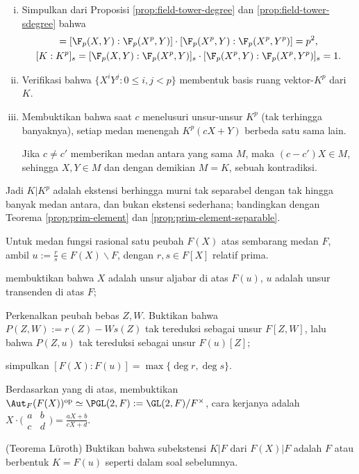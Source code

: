 \begin{Exercises}
\begin{enumerate}[(i)]
			\item Simpulkan dari Proposisi \ref{prop:field-tower-degree} dan \ref{prop:field-tower-sdegree} bahwa
				\begin{gather*}
					[K:K^p] = [\F_p(X,Y):\F_p(X^p,Y)] \cdot [\F_p(X^p,Y):\F_p(X^p,Y^p)] = p^2, \\
					[K:K^p]_s = [\F_p(X,Y):\F_p(X^p,Y)]_s \cdot [\F_p(X^p,Y):\F_p(X^p,Y^p)]_s = 1.
				\end{gather*}
			\item Verifikasi bahwa $\{ X^i Y^j: 0 \leq i,j < p \}$ membentuk basis ruang vektor-$K^p$ dari $K$.
			\item Membuktikan bahwa saat $c$ menelusuri unsur-unsur $K^p$ (tak terhingga banyaknya), setiap medan menengah $K^p(cX + Y)$ berbeda satu sama lain.
			\begin{hint} Jika $c \neq c'$ memberikan medan antara yang sama $M$, maka $(c-c')X \in M$, sehingga $X,Y \in M$ dan dengan demikian $M = K$, sebuah kontradiksi. \end{hint}
		\end{enumerate}
		Jadi $K|K^p$ adalah ekstensi berhingga murni tak separabel dengan tak hingga banyak medan antara, dan bukan ekstensi sederhana; bandingkan dengan Teorema \ref{prop:prim-element} dan \ref{prop:prim-element-separable}.
	\item Untuk medan fungsi rasional satu peubah $F(X)$ atas sembarang medan $F$, ambil $u := \frac{r}{s} \in F(X) \smallsetminus F$, dengan $r,s \in F[X]$ relatif prima.
		\begin{compactenum}[(i)]
			\item membuktikan bahwa $X$ adalah unsur aljabar di atas $F(u)$, $u$ adalah unsur transenden di atas $F$;
			\item Perkenalkan peubah bebas $Z, W$. Buktikan bahwa $P(Z,W) := r(Z) - Ws(Z)$ tak tereduksi sebagai unsur $F[Z,W]$, lalu bahwa $P(Z,u)$ tak tereduksi sebagai unsur $F(u)[Z]$;
			\item simpulkan $[F(X):F(u)] = \max\{\deg r, \deg s\}$.
		\end{compactenum}
	\item Berdasarkan yang di atas, membuktikan $\Aut_F(F(X))^{\mathrm{op}} \simeq \PGL(2,F) := \GL(2,F)/F^\times$, cara kerjanya adalah $X \cdot \bigl( \begin{smallmatrix} a & b \\ c & d \end{smallmatrix} \bigr) = \frac{aX+b}{cX+d}$.
	\item (Teorema Lüroth) Buktikan bahwa subekstensi $K|F$ dari $F(X)|F$ adalah $F$ atau berbentuk $K=F(u)$ seperti dalam soal sebelumnya. 

\end{Exercises}
